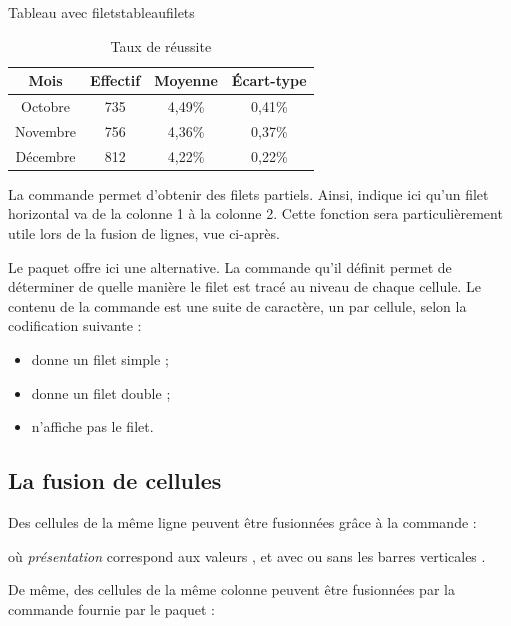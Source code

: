 \begin{codedoublefaux}{Tableau avec filets}{tableaufilets}
\begin{table}[!ht]
\centering
\begin{tabular}{|c||c|c|c|}
\hline 
Mois            & Effectif     & Moyenne      & \'{E}cart-type  \\ \hline \hline
Octobre         & 735          & 4,49\%       & 0,41\%          \\ \hline
Novembre        & 756          & 4,36\%       & 0,37\%          \\ \hline
Décembre        & 812          & 4,22\%       & 0,22\%          \\ \hline
\end{tabular}
\caption{Taux de réussite}
\end{table}
\end{codedoublefaux}


La commande  permet d'obtenir des filets partiels. Ainsi,  indique ici qu'un filet horizontal va de la colonne 1 à la colonne 2. Cette fonction sera particulièrement utile lors de la fusion de lignes, vue ci-après.

Le paquet  offre ici une alternative. La commande qu'il définit permet de déterminer de quelle manière le filet est tracé au niveau de chaque cellule. Le contenu de la commande est une suite de caractère, un par cellule, selon la codification suivante :
\begin{itemize}
\item \macron{-} donne un filet simple ; 
\item \macron{=} donne un filet double ; 
\item \macron{\~{}} n'affiche pas le filet. 
\end{itemize}


\subsection{La fusion de cellules}

Des cellules de la même ligne peuvent être fusionnées grâce à la commande :
\begin{center}
\end{center}
où \emph{présentation} correspond aux valeurs ,  et  avec ou sans les barres verticales \macron{|}.

De même, des cellules de la même colonne peuvent être fusionnées par la commande fournie par le paquet  :
\begin{center}
\end{center}

